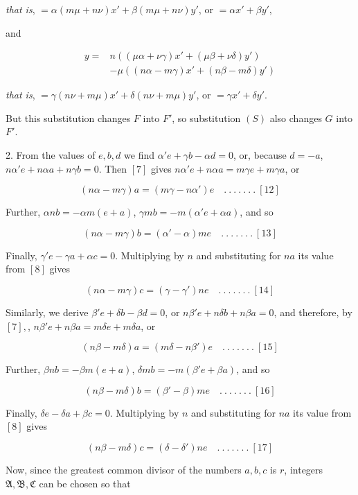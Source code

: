 \emph{that is}, $=\alpha(m\mu+n\nu)x'+\beta(m\mu+n\nu)y'$, or $=\alpha x'+\beta y'$,

and

\[
\begin{aligned}y={}&n((\mu\alpha+\nu\gamma)x'+(\mu\beta+\nu\delta)y')\\&-\mu((n\alpha-m\gamma)x'+(n\beta-m\delta)y')\end{aligned}
\]

\emph{that is}, $=\gamma(n\nu+m\mu)x'+\delta(n\nu+m\mu)y'$, or $=\gamma x'+\delta y'$.


But this substitution changes $F$ into $F'$, so substitution $(S)$ also changes $G$ into $F'$.

2. From the values of $e,b,d$ we find $\alpha'e+\gamma b-\alpha d=0$, or, because $d=-a$, $n\alpha'e+n\alpha a+n\gamma b=0$. Then $[7]$ gives $n\alpha'e+n\alpha a=m\gamma e+m\gamma a$, or

\[
(n\alpha-m\gamma)a=(m\gamma-n\alpha')e\quad .\ .\ .\ .\ .\ .\ .\ [12]
\]

Further, $\alpha nb=-\alpha m(e+a)$, $\gamma mb=-m(\alpha'e+\alpha a)$, and so

\[
(n\alpha-m\gamma)b=(\alpha'-\alpha)me\quad .\ .\ .\ .\ .\ .\ .\ [13]
\]

Finally, $\gamma'e-\gamma a+\alpha c=0$. Multiplying by $n$ and substituting for $na$ its value from $[8]$ gives

\[
(n\alpha-m\gamma)c=(\gamma-\gamma')ne\quad .\ .\ .\ .\ .\ .\ .\ [14]
\]

Similarly, we derive $\beta'e+\delta b-\beta d=0$, or $n\beta'e+n\delta b+n\beta a=0$, and therefore, by $[7],$, $n\beta'e+n\beta a=m\delta e+m\delta a$, or

\[
(n\beta-m\delta)a=(m\delta-n\beta')e\quad .\ .\ .\ .\ .\ .\ .\ [15]
\]

Further, $\beta nb=-\beta m(e+a)$, $\delta mb=-m(\beta'e+\beta a)$, and so

\[
(n\beta-m\delta)b=(\beta'-\beta)me\quad .\ .\ .\ .\ .\ .\ .\ [16]
\]

Finally, $\delta e-\delta a+\beta c=0$. Multiplying by $n$ and substituting for $na$ its value from $[8]$ gives

\[
(n\beta-m\delta)c=(\delta-\delta')ne\quad .\ .\ .\ .\ .\ .\ .\ [17]
\]

Now, since the greatest common divisor of the numbers $a,b,c$ is $r$, integers $\mathfrak{A},\mathfrak{B},\mathfrak{C}$ can be chosen so that

